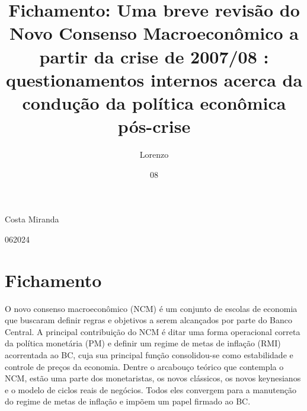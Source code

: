 \documentclass[report]{uftex}
\newcommand\uftex{UF\TeX}
\begin{document}
  \title{Fichamento: Uma breve
  	revisão do Novo Consenso Macroeconômico
  	a partir da crise de 2007/08 : questionamentos internos
  	acerca da condução da política econômica pós-crise}
  \author{Lorenzo}{Costa Miranda}
  \date{08}{06}{2024}
  \keyword{\LaTeX}
  \keyword{\uftex}
  \foreignkeyword{\LaTeX}
  \foreignkeyword{\uftex}
  \maketitle

  \frontmatter

  \printlosymbols  
  \printloabbreviations
 
\mainmatter
\onehalfspacing
\chapter{Fichamento}

O novo consenso macroeconômico (NCM) é um conjunto de escolas de economia que buscaram definir regras e objetivos a serem alcançados por parte do Banco Central. A principal contribuição do NCM é ditar uma forma operacional correta da política monetária (PM) e definir um regime de metas de inflação (RMI) acorrentada ao BC, cuja sua principal função consolidou-se como estabilidade e controle de preços da economia. Dentre o arcabouço teórico que contempla o NCM, estão uma parte dos monetaristas, os novos clássicos, os novos keynesianos e o modelo de ciclos reais de negócios. Todos eles convergem para a manutenção do regime de metas de inflação e impõem um papel firmado ao BC. 
\end{document}
